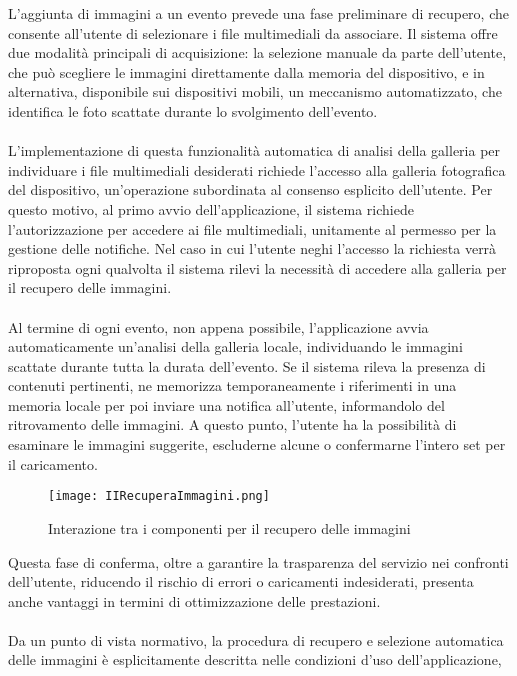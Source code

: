 L'aggiunta di immagini a un evento prevede una fase preliminare di recupero, 
che consente all'utente di selezionare i file multimediali da associare. 
Il sistema offre due modalità principali di acquisizione: 
la selezione manuale da parte dell'utente, 
che può scegliere le immagini direttamente dalla memoria del dispositivo, 
e in alternativa, disponibile sui dispositivi mobili, un meccanismo automatizzato, 
che identifica le foto scattate durante lo svolgimento dell'evento.\\
\\
L'implementazione di questa funzionalità automatica di analisi della galleria 
per individuare i file multimediali desiderati  richiede l'accesso alla galleria fotografica del dispositivo, 
un'operazione subordinata al consenso esplicito dell'utente. 
Per questo motivo, al primo avvio dell'applicazione, 
il sistema richiede l'autorizzazione per accedere ai file multimediali, 
unitamente al permesso per la gestione delle notifiche. 
Nel caso in cui l'utente neghi l'accesso 
la richiesta verrà riproposta ogni qualvolta il sistema rilevi la necessità 
di accedere alla galleria per il recupero delle immagini.\\
\\
Al termine di ogni evento, non appena possibile, 
l'applicazione avvia automaticamente un'analisi della galleria locale, 
individuando le immagini scattate durante tutta la durata dell'evento. 
Se il sistema rileva la presenza di contenuti pertinenti, 
ne memorizza temporaneamente i riferimenti in una memoria locale per poi inviare una notifica all'utente, 
informandolo del ritrovamento delle immagini. 
A questo punto, l'utente ha la possibilità di esaminare le immagini suggerite, 
escluderne alcune o confermarne l'intero set per il caricamento.\\
\begin{figure}[htb]
    \centering
    \texttt{[image: IIRecuperaImmagini.png]}
    \caption{Interazione tra i componenti per il recupero delle immagini}
\end{figure}
\clearpage
Questa fase di conferma, oltre a garantire la trasparenza del servizio nei confronti dell'utente, 
riducendo il rischio di errori o caricamenti indesiderati, 
presenta anche vantaggi in termini di ottimizzazione delle prestazioni. \\
\\
Da un punto di vista normativo, 
la procedura di recupero e selezione automatica delle immagini
è esplicitamente descritta nelle condizioni d'uso dell'applicazione, 

